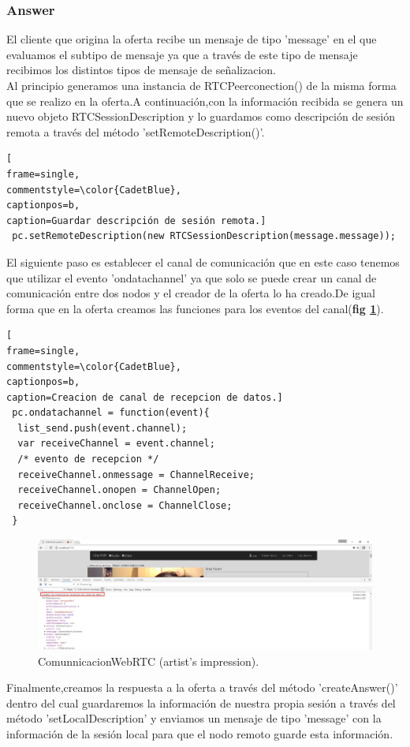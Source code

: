 \subsubsection{Answer}
El cliente que origina la oferta recibe un mensaje de tipo 'message' en el que evaluamos el subtipo de mensaje ya que a través de este tipo de mensaje recibimos los distintos tipos de mensaje de señalizacion.
\\Al principio generamos una instancia de RTCPeerconection() de la misma forma que se realizo en la oferta.A continuación,con la información recibida se genera un nuevo objeto RTCSessionDescription y lo guardamos como descripción de sesión remota a través del método 'setRemoteDescription()'. 
\begin{lstlisting}[
frame=single,
commentstyle=\color{CadetBlue},
captionpos=b,
caption=Guardar descripción de sesión remota.]
 pc.setRemoteDescription(new RTCSessionDescription(message.message));
\end{lstlisting}
El siguiente paso es establecer el canal de comunicación que en este caso tenemos que utilizar el evento 'ondatachannel' ya que solo se puede crear un canal de comunicación entre dos nodos y el creador de la oferta lo ha creado.De igual forma que en la oferta creamos las funciones para los eventos del canal(\textbf{fig \ref{fig:DataChannelAnswer}}). 
\begin{lstlisting}[
frame=single,
commentstyle=\color{CadetBlue},
captionpos=b,
caption=Creacion de canal de recepcion de datos.]
 pc.ondatachannel = function(event){
  list_send.push(event.channel);
  var receiveChannel = event.channel;
  /* evento de recepcion */
  receiveChannel.onmessage = ChannelReceive;
  receiveChannel.onopen = ChannelOpen;
  receiveChannel.onclose = ChannelClose;
 }
\end{lstlisting}
\begin{figure}[!h]
\centering
\includegraphics[width=0.7\linewidth]{Figures/DataChannelAnswer}
\decoRule
\caption[An Electron]{ComunnicacionWebRTC (artist's impression).}
\label{fig:DataChannelAnswer}
\end{figure}
Finalmente,creamos la respuesta a la oferta a través del método 'createAnswer()' dentro del cual guardaremos la información de nuestra propia sesión a través del método 'setLocalDescription' y enviamos un mensaje de tipo 'message' con la información de la sesión local para que el nodo remoto guarde esta información.
